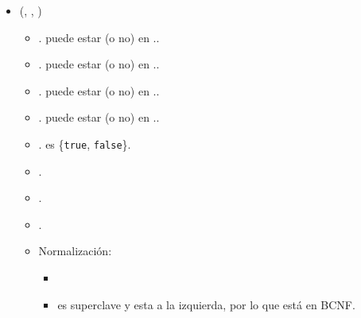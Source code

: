\begin{itemize}
    \item {}(, ,
          )
          \begin{itemize}
              \item {}. puede estar (o no) en
                    ..
              \item {}. puede estar (o no) en
                    ..
              \item {}. puede estar (o no) en
                    ..
              \item {}. puede estar (o no) en
                    ..
              \item {}. es \{\texttt{true},
                    \texttt{false}\}.
              \item {}.
              \item {}.
              \item \FK{$\emptyset$}.
              \item Normalización:
                    \begin{itemize}
                        \item {}
                        \item {} es superclave y esta a la
                              izquierda, por lo que está en BCNF.
                    \end{itemize}
          \end{itemize}


\end{itemize}
